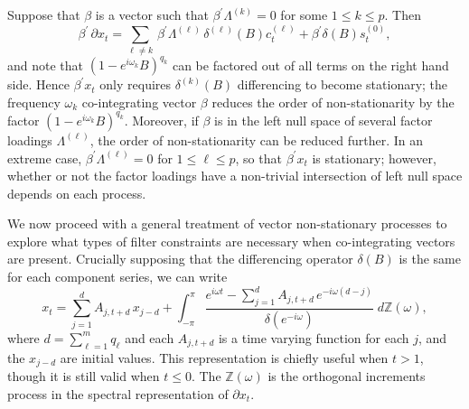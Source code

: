 \documentclass[a4paper]{book}
\def\ZZ{\mathbb Z}
\begin{document}
 Suppose that $\beta$ is a vector such that $\beta^{\prime}
 \Lambda^{(k)} = 0$ for some $1 \leq k \leq p$.  Then
\[
 \beta^{\prime} \, \partial x_t = \sum_{\ell \neq k} \,
 \beta^{\prime} \Lambda^{(\ell)} \, \delta^{(\ell)} (B)
 c^{(\ell)}_t + \beta^{\prime} \delta (B) s^{(0)}_t,
\]
 and note that ${(1 - e^{i \omega_{k}} B )}^{q_{k}}$ can be factored
 out of all terms on the right hand side.  Hence $\beta^{\prime}
 x_t$ only requires $\delta^{(k)} (B)$ differencing to become
 stationary; the frequency $\omega_k$ co-integrating vector $\beta$
 reduces the order of non-stationarity by the factor ${(1 - e^{i \omega_{k}} B
 )}^{q_{k}}$.  Moreover, if $\beta$ is in the left null space of
 several factor loadings $\Lambda^{(\ell)}$, the order of
 non-stationarity can be reduced further.  In an extreme case,
 $\beta^{\prime} \Lambda^{(\ell)} = 0$ for $1 \leq \ell \leq p$, so
 that $\beta^{\prime} x_t$ is stationary; however, whether or not
 the factor loadings have a non-trivial intersection of left null
 space depends on each process.

 We now proceed with a general treatment of vector non-stationary
 processes to explore what types of filter constraints are necessary
 when co-integrating vectors are present.  Crucially supposing that the
 differencing operator $\delta (B)$ is the same for each component
 series, we can write
\[
 x_t = \sum_{j=1}^d A_{j, t+d} \, x_{j-d} + \int_{-\pi}^{\pi}
 \frac{ e^{i \omega t} - \sum_{j=1}^d A_{j,t+d} \, e^{-i \omega
 (d-j)} }{ \delta (e^{-i \omega}) } \; d \ZZ (\omega),
\]
 where $d = \sum_{\ell=1}^m q_{\ell}$ and each $A_{j, t+d}$ is a
 time varying function for each $j$, and the $x_{j-d}$ are initial
 values.  This representation is chiefly useful when $t > 1$, though
 it is still valid when $t \leq 0$.  The $\ZZ (\omega)$ is the
 orthogonal increments process in the spectral representation of
 $\partial x_t$. 
\end{document}
